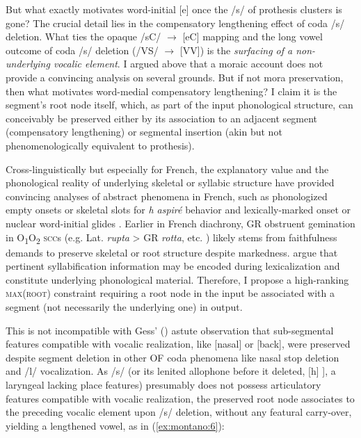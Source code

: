 \documentclass[output=paper,colorlinks,citecolor=brown,
]{langscibook}
\begin{document}
But what exactly motivates word-initial [e] once the /s/ of prothesis clusters is gone?  The crucial detail lies in the compensatory lengthening effect of coda /s/ deletion.  What ties the opaque /sC/ $\rightarrow$ [eC] mapping and the long vowel outcome of coda /s/ deletion (/VS/ $\rightarrow$ [VV]) is the \textit{surfacing of a non-underlying vocalic element}.  I argued above that a moraic account does not provide a convincing analysis on several grounds.  But if not mora preservation, then what motivates word-medial compensatory lengthening?  I claim it is the segment's root node itself, which, as part of the input phonological structure, can conceivably be preserved either by its association to an adjacent segment (compensatory lengthening) or segmental insertion (akin but not phenomenologically equivalent to prothesis).

Cross-linguistically but especially for French, the explanatory value and the phonological reality of underlying skeletal or syllabic structure have provided convincing analyses of abstract phenomena in French, such as phonologized empty onsets or skeletal slots for \textit{h aspiré} behavior \citep{Durand1986} and lexically-marked onset or nuclear word-initial glides \citep{KayeLowenstamm1984}.  Earlier in French diachrony, GR obstruent gemination in O\textsubscript{1}O\textsubscript{2} \textsc{scc}s (e.g. Lat. \textit{rupta} > GR \textit{rotta}, etc. \citep{Pope1952, Gess2004}) likely stems from faithfulness demands to preserve skeletal or root structure despite markedness.  \citet{FaustScheer2018} argue that pertinent syllabification information may be encoded during lexicalization and constitute underlying phonological material.  Therefore, I propose a high-ranking \textsc{max}(\textsc{root}) constraint requiring a root node in the input be associated with a segment (not necessarily the underlying one) in output.

This is not incompatible with Gess' (\citeyear{Gess1998, Gess1999}) astute observation that sub-segmental features compatible with vocalic realization, like [nasal] or [back], were preserved despite segment deletion in other OF coda phenomena like nasal stop deletion and /l/ vocalization.  As /s/ (or its lenited allophone before it deleted, [h] \citep{Pope1952, Gess1999}], a laryngeal lacking place features) presumably does not possess articulatory features compatible with vocalic realization, the preserved root node associates to the preceding vocalic element upon /s/ deletion, without any featural carry-over, yielding a lengthened vowel, as in (\ref{ex:montano:6}):
\end{document}
